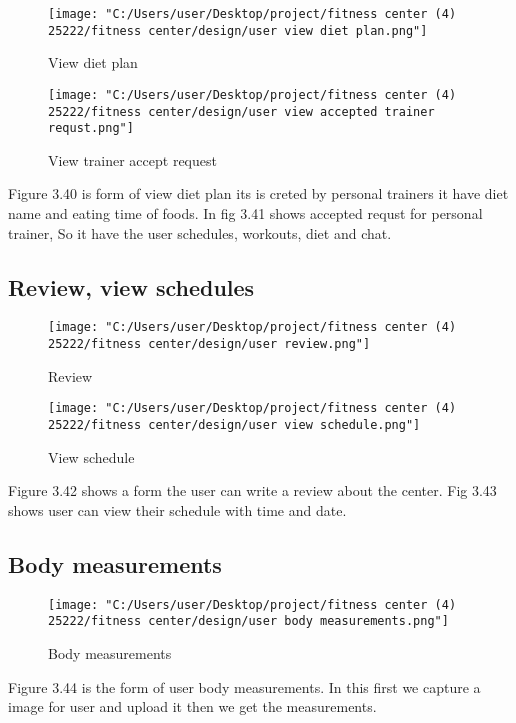 \documentclass[a4paper,12pt,toc=flat]{report}
\begin{document}
{{	\begin{figure}[!ht]
		\begin{minipage}{0.45\linewidth}
			\texttt{[image: "C:/Users/user/Desktop/project/fitness center (4) 25222/fitness center/design/user view diet plan.png"]}
			\caption{View diet plan}
		\end{minipage}
		\hfill
		\begin{minipage}{0.45\linewidth}
			\texttt{[image: "C:/Users/user/Desktop/project/fitness center (4) 25222/fitness center/design/user view accepted trainer requst.png"]}
			\caption{ View trainer accept request}
		\end{minipage}
	\end{figure}
	
	 \hspace*{12pt}Figure 3.40 is form of view diet plan its is creted  by personal trainers it have diet name and eating time of foods. In fig 3.41 shows accepted requst for personal trainer, So it have the user schedules, workouts, diet and chat.
	
	\pagebreak
	\subsection{Review, view schedules}
	
	\begin{figure}[!ht]
		\begin{minipage}{0.45\linewidth}
			\texttt{[image: "C:/Users/user/Desktop/project/fitness center (4) 25222/fitness center/design/user review.png"]}
			\caption{Review}
		\end{minipage}
		\hfill
		\begin{minipage}{0.45\linewidth}
			\texttt{[image: "C:/Users/user/Desktop/project/fitness center (4) 25222/fitness center/design/user view schedule.png"]}
			\caption{ View schedule}
		\end{minipage}
	\end{figure}
	
	 \hspace*{12pt}Figure 3.42 shows a form the user can write a review about the center. Fig 3.43 shows user can view their schedule with time and date.
	\pagebreak
	
	
	
	\subsection{ Body measurements }
	\begin{figure}[bph]
		\begin{center}
			\texttt{[image: "C:/Users/user/Desktop/project/fitness center (4) 25222/fitness center/design/user body measurements.png"]}
		\end{center}
		\caption{Body measurements}
	\end{figure}
	 \hspace*{12pt}Figure 3.44 is the form of user body measurements. In this first we capture a image for user and upload it then we get the measurements.
	
}}
\end{document}
